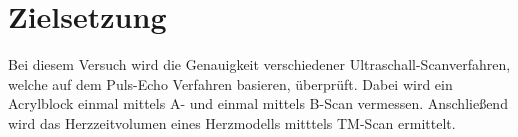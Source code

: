 \section{Zielsetzung}
\label{sec:Zielsetzung}
Bei diesem Versuch wird die Genauigkeit verschiedener Ultraschall-Scanverfahren, welche auf dem Puls-Echo Verfahren basieren, überprüft.
Dabei wird ein Acrylblock einmal mittels A- und einmal mittels B-Scan vermessen. Anschließend wird das Herzzeitvolumen eines Herzmodells mitttels TM-Scan ermittelt.
